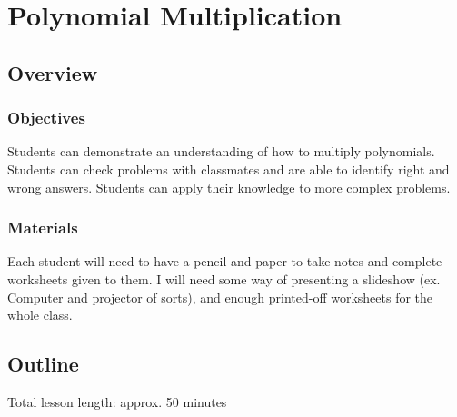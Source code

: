 \chapter{Polynomial Multiplication}

\section{Overview}

\subsection{Objectives}

\begin{outline}
    \1 Students can demonstrate an understanding of how to multiply polynomials.
    \1 Students can check problems with classmates and are able to identify right and wrong answers.
    \1 Students can apply their knowledge to more complex problems.
\end{outline}

\subsection{Materials}

Each student will need to have a pencil and paper to take notes and complete worksheets given to them. I will need some way of presenting a slideshow (ex. Computer and projector of sorts), and enough printed-off worksheets for the whole class.

\section{Outline}

Total lesson length: approx. 50 minutes

